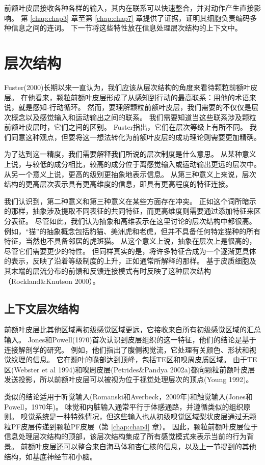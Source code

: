 前额叶皮层接收各种各样的输入，其内在联系可以快速整合，并对动作产生直接影响。
第 \ref{chap:chap3} 章至第 \ref{chap:chap7} 章提供了证据，证明其细胞负责编码多种信息之间的连词。
下一节将这些特性放在信息处理层次结构的上下文中。



\section{层次结构}
\par

Fuster(2000)长期以来一直认为，我们应该从层次结构的角度来看待颗粒前额叶皮层。
在他看来，颗粒前额叶皮层形成了从感知到行动的最高联系：用他的术语来说，就是感知-行动循环。
然而，要理解颗粒前额叶皮层，我们需要的不仅仅是层次概念以及感觉输入和运动输出之间的联系。
我们需要知道当这些联系涉及颗粒前额叶皮层时，它们之间的区别。
Fuster指出，它们在层次等级上有所不同。
我们同意这种观点，但要将这一想法转化为前额叶皮层的成功理论则需要更加精确。
\par


为了达到这一精度，我们需要解释我们所说的层次制度是什么意思。
从某种意义上说，与较低的成分相比，较高的成分位于离感觉输入或运动输出更远的层次中。
从另一个意义上说，更高的级别更抽象地表示信息。
从第三种意义上来说，层次结构的更高层次表示具有更高维度的信息，即具有更高程度的特征连接。
\par


我们认识到，第二种意义和第三种意义在某些方面存在冲突。
正如这个词所暗示的那样，抽象涉及提取不同表征的共同特征，而更高维度则需要通过添加特征来区分表征。
尽管如此，我们认为抽象和高维表示在这里讨论的层次结构中都很高。
例如，“猫”的抽象概念包括豹猫、美洲虎和老虎，但并不具备任何特定猫种的所有特征，当然也不具备邻居的虎斑猫。
从这个意义上说，抽象在层次上是很高的，尽管它们需要更少的特性。
但同样真实的是，将许多特征合成为一个逐渐更具体的表示，反映了沿着等级制度的上升，正如通常所解释的那样。
基于皮质细胞及其末端的层流分布的前馈和反馈连接模式有时反映了这种层次结构（Rockland\&Knutson 2000）。



\subsection{上下文层次结构}
\par
前额叶皮层比其他区域离初级感觉区域更远，它接收来自所有初级感觉区域的汇总输入。
Jones和Powell(1970)首次认识到皮层组织的这一特征，他们的结论是基于连接解剖学的研究。
例如，他们指出了腹侧视觉流，它处理有关颜色、形状和视觉纹理的信息。
它在颞叶的喙部达到顶峰，包括TE区和嗅周皮质区域。
由于TE区(Webster et al 1994)和嗅周皮层(Petrides\&Pandya 2002a)都向颗粒前额叶皮层发送投影，所以前额叶皮层可以被视为位于视觉处理层次的顶点(Young 1992)。
\par
类似的结论适用于听觉输入(Romanski和Averbeck，2009年)和触觉输入(Jones和Powell，1970年)。
味觉和内脏输入通常平行于体感通路，并遵循类似的组织原则。
嗅觉系统是一种特殊情况，但这些输入也从初级嗅觉区域梨状皮层通过无颗粒PF皮层传递到颗粒PF皮层（第 \ref{chap:chap4} 章）。
因此，颗粒前额叶皮层位于信息处理层次结构的顶部，该层次结构集成了所有感觉模式来表示当前的行为背景。
前额叶皮层还可以整合来自海马体和杏仁核的信息，以及上一节提到的其他结构，如基底神经节和小脑。
\par


